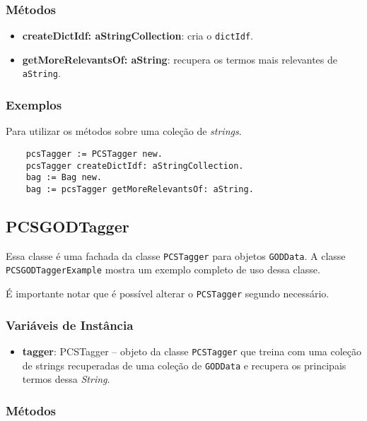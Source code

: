 \subsubsection{Métodos}

\begin{itemize}
    \item \textbf{createDictIdf: aStringCollection}: cria o \texttt{dictIdf}.
    \item \textbf{getMoreRelevantsOf: aString}: recupera os termos mais relevantes de \texttt{aString}.
\end{itemize}


\subsubsection{Exemplos}
Para utilizar os métodos sobre uma coleção de \textit{strings}.
    \begin{verbatim}
    pcsTagger := PCSTagger new.
    pcsTagger createDictIdf: aStringCollection.
    bag := Bag new.
    bag := pcsTagger getMoreRelevantsOf: aString.
    \end{verbatim}
    
\subsection{PCSGODTagger}
Essa classe é uma fachada da classe \texttt{PCSTagger} para objetos \texttt{GODData}. A classe
\texttt{PCSGODTaggerExample} mostra um exemplo completo de uso dessa classe.

É importante notar que é possível alterar o \texttt{PCSTagger} segundo necessário.

\subsubsection{Variáveis de Instância}
\begin{itemize}
 \item \textbf{tagger}: PCSTagger -- objeto da classe \texttt{PCSTagger} que treina com uma coleção de 
                              strings recuperadas de uma coleção de \texttt{GODData} e recupera
                              os principais termos dessa \textit{String}.
\end{itemize}


\subsubsection{Métodos}

